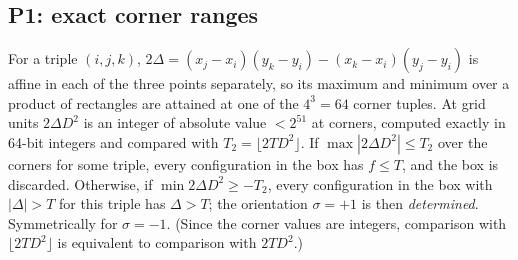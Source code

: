 \documentclass[11pt]{amsart}
\theoremstyle{definition}
\begin{document}
\subsection{P1: exact corner ranges}
For a triple $(i,j,k)$, $2\Delta = (x_j - x_i)(y_k - y_i) - (x_k - x_i)(y_j - y_i)$ is affine in each of the three points separately, so its maximum and minimum over a product of rectangles are attained at one of the $4^3 = 64$ corner tuples. At grid units $2\Delta D^2$ is an integer of absolute value $< 2^{51}$ at corners, computed exactly in 64-bit integers and compared with $T_2 = \lfloor 2TD^2 \rfloor$. %
If $\max |2\Delta D^2| \le T_2$ over the corners for some triple, every configuration in the box has $f \le T$, and the box is discarded. Otherwise, if $\min 2\Delta D^2 \ge -T_2$, every configuration in the box with $\lvert\Delta\rvert > T$ for this triple has $\Delta > T$; the orientation $\sigma = +1$ is then \emph{determined}. Symmetrically for $\sigma = -1$. (Since the corner values are integers, comparison with $\lfloor 2TD^2\rfloor$ is equivalent to comparison with $2TD^2$.)
\end{document}
